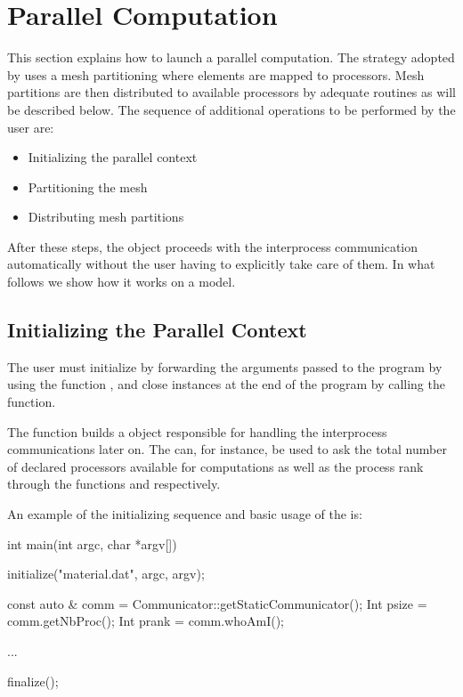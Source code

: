 \chapter{Parallel Computation}

This section explains how to launch a parallel computation.
The strategy adopted by \akantu uses a mesh partitioning
where elements are mapped to processors. Mesh partitions are
then distributed to available processors by adequate routines
as will be described below.
The sequence of additional operations to be performed by the user are:

\begin{itemize}
\item Initializing the parallel context
\item Partitioning the mesh
\item Distributing mesh partitions
\end{itemize}

After these steps, the 
object proceeds with the interprocess communication automatically
without the user having to explicitly take care of them.
In what follows we show how it works on a  model.

\section{Initializing the Parallel Context}

The user must initialize \akantu by forwarding the arguments passed to the
program by using the function , and close \akantu instances
at the end of the program by calling the  function.


The  function builds a  object
responsible for handling the interprocess communications later on.  The
 can, for instance, be used to ask the total number of
declared processors available for computations as well as the process rank
through the functions  and  respectively.

An example of the initializing sequence and basic usage of the
 is:

\begin{cpp}
int main(int argc, char *argv[]) {
  initialize("material.dat", argc, argv);

  const auto & comm = Communicator::getStaticCommunicator();
  Int psize = comm.getNbProc();
  Int prank = comm.whoAmI();

  ...

  finalize();
}
\end{cpp}

